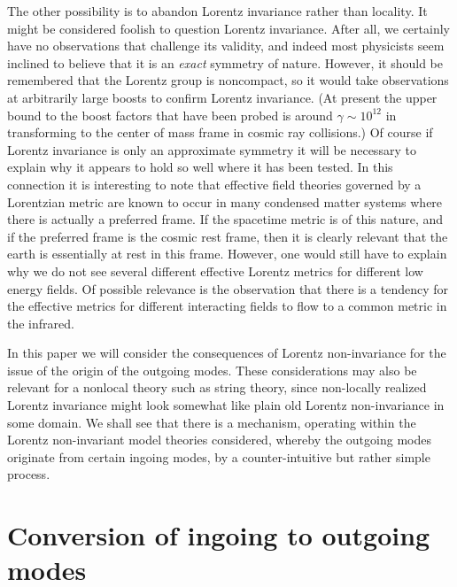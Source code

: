 \documentclass[12pt]{article}
\begin{document}
The other possibility is to abandon Lorentz invariance rather than
locality.  It might be considered foolish to question Lorentz
invariance.  After all, we certainly have no observations that
challenge its validity, and indeed most physicists seem inclined to
believe that it is an {\it exact} symmetry of nature.  However, it
should be remembered that the Lorentz group is noncompact, so it would
take observations at arbitrarily large boosts to confirm Lorentz
invariance. (At present the upper bound to the boost factors that have
been probed is around $\gamma\sim 10^{12}$ in transforming to the
center of mass frame in cosmic ray collisions.) Of course if Lorentz
invariance is only an approximate symmetry it will be necessary to
explain why it appears to hold so well where it has been tested.  In
this connection it is interesting to note that effective field theories
governed by a Lorentzian metric are known to occur in many condensed
matter systems where there is actually a preferred frame. If the
spacetime metric is of this nature, and if the preferred frame is the
cosmic rest frame, then it is clearly relevant that the earth is
essentially at rest in this frame.  However, one would still have to
explain why we do not see several different effective Lorentz metrics
for different low energy fields. Of possible relevance is the
observation\cite{ChadNiel,NielNino} that there is a tendency for the
effective metrics for different interacting fields to flow to a common
metric in the infrared.

In this paper we will consider the consequences of Lorentz
non-invariance for the issue of the origin of the outgoing modes. These
considerations may also be relevant for a nonlocal theory such as
string theory, since non-locally realized Lorentz invariance might look
somewhat like plain old Lorentz non-invariance in some domain. We shall
see that there is a mechanism, operating within the Lorentz
non-invariant model theories considered, whereby the outgoing modes
originate from certain ingoing modes, by a counter-intuitive but rather
simple process.


\section{Conversion of ingoing to outgoing modes}
\end{document}
